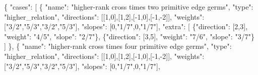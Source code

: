 \documentclass[
  11pt,
]{article}
\newenvironment{Shaded}{}{}
\newcommand{\DataTypeTok}[1]{\textcolor[rgb]{0.56,0.13,0.00}{#1}}
\newcommand{\DecValTok}[1]{\textcolor[rgb]{0.25,0.63,0.44}{#1}}
\newcommand{\FunctionTok}[1]{\textcolor[rgb]{0.02,0.16,0.49}{#1}}
\newcommand{\OtherTok}[1]{\textcolor[rgb]{0.00,0.44,0.13}{#1}}
\newcommand{\StringTok}[1]{\textcolor[rgb]{0.25,0.44,0.63}{#1}}
\begin{document}
\begin{Shaded}
\begin{Highlighting}[]
\FunctionTok{\{}
  \DataTypeTok{"cases"}\FunctionTok{:} \OtherTok{[}
    \FunctionTok{\{}
      \DataTypeTok{"name"}\FunctionTok{:} \StringTok{"higher{-}rank cross times two primitive edge germs"}\FunctionTok{,}
      \DataTypeTok{"type"}\FunctionTok{:} \StringTok{"higher\_relation"}\FunctionTok{,}
      \DataTypeTok{"directions"}\FunctionTok{:} \OtherTok{[[}\DecValTok{1}\OtherTok{,}\DecValTok{0}\OtherTok{],[}\DecValTok{1}\OtherTok{,}\DecValTok{2}\OtherTok{],[}\DecValTok{{-}1}\OtherTok{,}\DecValTok{0}\OtherTok{],[}\DecValTok{{-}1}\OtherTok{,}\DecValTok{{-}2}\OtherTok{]]}\FunctionTok{,}
      \DataTypeTok{"weights"}\FunctionTok{:} \OtherTok{[}\StringTok{"3/2"}\OtherTok{,}\StringTok{"5/3"}\OtherTok{,}\StringTok{"3/2"}\OtherTok{,}\StringTok{"5/3"}\OtherTok{]}\FunctionTok{,}
      \DataTypeTok{"slopes"}\FunctionTok{:} \OtherTok{[}\DecValTok{0}\OtherTok{,}\StringTok{"1/7"}\OtherTok{,}\DecValTok{0}\OtherTok{,}\StringTok{"1/7"}\OtherTok{]}\FunctionTok{,}
      \DataTypeTok{"extra"}\FunctionTok{:} \OtherTok{[}
        \FunctionTok{\{}\DataTypeTok{"direction"}\FunctionTok{:} \OtherTok{[}\DecValTok{2}\OtherTok{,}\DecValTok{3}\OtherTok{]}\FunctionTok{,} \DataTypeTok{"weight"}\FunctionTok{:} \StringTok{"4/5"}\FunctionTok{,} \DataTypeTok{"slope"}\FunctionTok{:} \StringTok{"2/7"}\FunctionTok{\}}\OtherTok{,}
        \FunctionTok{\{}\DataTypeTok{"direction"}\FunctionTok{:} \OtherTok{[}\DecValTok{3}\OtherTok{,}\DecValTok{5}\OtherTok{]}\FunctionTok{,} \DataTypeTok{"weight"}\FunctionTok{:} \StringTok{"7/6"}\FunctionTok{,} \DataTypeTok{"slope"}\FunctionTok{:} \StringTok{"3/7"}\FunctionTok{\}}
      \OtherTok{]}
    \FunctionTok{\}}\OtherTok{,}
    \FunctionTok{\{}
      \DataTypeTok{"name"}\FunctionTok{:} \StringTok{"higher{-}rank cross times four primitive edge germs"}\FunctionTok{,}
      \DataTypeTok{"type"}\FunctionTok{:} \StringTok{"higher\_relation"}\FunctionTok{,}
      \DataTypeTok{"directions"}\FunctionTok{:} \OtherTok{[[}\DecValTok{1}\OtherTok{,}\DecValTok{0}\OtherTok{],[}\DecValTok{1}\OtherTok{,}\DecValTok{2}\OtherTok{],[}\DecValTok{{-}1}\OtherTok{,}\DecValTok{0}\OtherTok{],[}\DecValTok{{-}1}\OtherTok{,}\DecValTok{{-}2}\OtherTok{]]}\FunctionTok{,}
      \DataTypeTok{"weights"}\FunctionTok{:} \OtherTok{[}\StringTok{"3/2"}\OtherTok{,}\StringTok{"5/3"}\OtherTok{,}\StringTok{"3/2"}\OtherTok{,}\StringTok{"5/3"}\OtherTok{]}\FunctionTok{,}
      \DataTypeTok{"slopes"}\FunctionTok{:} \OtherTok{[}\DecValTok{0}\OtherTok{,}\StringTok{"1/7"}\OtherTok{,}\DecValTok{0}\OtherTok{,}\StringTok{"1/7"}\OtherTok{]}\FunctionTok{,}

\end{Highlighting}
\end{Shaded}
\end{document}
